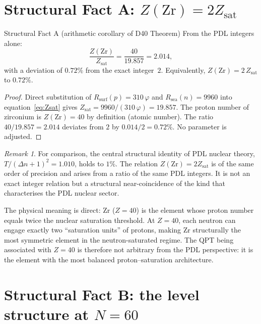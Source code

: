 \documentclass[11pt,a4paper]{article}
\theoremstyle{definition}
\theoremstyle{remark}
\newtheorem{remark}[theorem]{Remark}
\newcommand{\Rsurf}{R_{\mathrm{surf}}}
\newcommand{\Rsea}{R_{\mathrm{sea}}}
\newcommand{\Zsat}{Z_{\mathrm{sat}}}
\newcommand{\Dn}{\Delta n}
\newcommand{\vp}{\varphi}
\newcommand{\Tpdl}{T}
\begin{document}
\section{Structural Fact A: \texorpdfstring{$Z(\mathrm{Zr}) = 2\Zsat$}{Z(Zr) = 2Zsat}}
\label{sec:zsat}

\begin{pdltheorem}{Structural Fact A (arithmetic corollary of D40 Theorem)}
From the PDL integers alone:
\begin{equation}
  \frac{Z(\mathrm{Zr})}{\Zsat} = \frac{40}{19.857} = 2.014,
  \label{eq:ZZrZsat}
\end{equation}
with a deviation of $0.72\%$ from the exact integer~$2$. Equivalently, $Z(\mathrm{Zr}) = 2\,\Zsat$ to $0.72\%$.
\end{pdltheorem}

\begin{proof}
Direct substitution of $\Rsurf(p) = 310\,\vp$ and $\Rsea(n) = 9960$ into equation~\eqref{eq:Zsat} gives $\Zsat = 9960/(310\,\vp) = 19.857$. The proton number of zirconium is $Z(\mathrm{Zr}) = 40$ by definition (atomic number). The ratio $40/19.857 = 2.014$ deviates from $2$ by $0.014/2 = 0.72\%$. No parameter is adjusted.
\end{proof}

\begin{remark}
For comparison, the central structural identity of PDL nuclear theory, $\Tpdl/(\Dn+1)^2 = 1.010$, holds to $1\%$. The relation $Z(\mathrm{Zr}) = 2\Zsat$ is of the same order of precision and arises from a ratio of the same PDL integers. It is not an exact integer relation but a structural near-coincidence of the kind that characterises the PDL nuclear sector.
\end{remark}

The physical meaning is direct: Zr ($Z=40$) is the element whose proton number equals twice the nuclear saturation threshold. At $Z=40$, each neutron can engage exactly two ``saturation units'' of protons, making Zr structurally the most symmetric element in the neutron-saturated regime. The QPT being associated with $Z=40$ is therefore not arbitrary from the PDL perspective: it is the element with the most balanced proton--saturation architecture.

\section{Structural Fact B: the level structure at \texorpdfstring{$N=60$}{N=60}}
\label{sec:levels}
\end{document}
